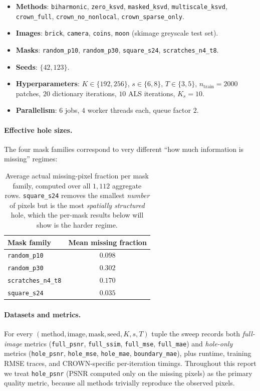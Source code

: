 \documentclass[11pt,a4paper]{article}
\newcommand{\method}[1]{\texttt{#1}}
\begin{document}
\begin{itemize}[leftmargin=1.2em,itemsep=2pt,topsep=2pt]
\item \textbf{Methods}: \method{biharmonic}, \method{zero\_ksvd},
\method{masked\_ksvd}, \method{multiscale\_ksvd},
\method{crown\_full}, \method{crown\_no\_nonlocal},
\method{crown\_sparse\_only}.
\item \textbf{Images}: \texttt{brick}, \texttt{camera},
\texttt{coins}, \texttt{moon} (skimage greyscale test set).
\item \textbf{Masks}: \texttt{random\_p10}, \texttt{random\_p30},
\texttt{square\_s24}, \texttt{scratches\_n4\_t8}.
\item \textbf{Seeds}: $\{42, 123\}$.
\item \textbf{Hyperparameters}: $K\in\{192,256\}$, $s\in\{6,8\}$,
$T\in\{3,5\}$, $n_{\text{train}}=2000$ patches, $20$ dictionary
iterations, $10$ ALS iterations, $K_s=10$.
\item \textbf{Parallelism}: $6$ jobs, $4$ worker threads each, queue
factor $2$.
\end{itemize}

\paragraph{Effective hole sizes.}
The four mask families correspond to very different
``how much information is missing'' regimes:

\begin{table}[h]
\centering\small
\begin{tabular}{lc}
\toprule
Mask family & Mean missing fraction \\
\midrule
\texttt{random\_p10}      & $0.098$ \\
\texttt{random\_p30}      & $0.302$ \\
\texttt{scratches\_n4\_t8}& $0.170$ \\
\texttt{square\_s24}      & $0.035$ \\
\bottomrule
\end{tabular}
\caption{Average actual missing-pixel fraction per mask family,
computed over all $1{,}112$ aggregate rows. \texttt{square\_s24}
removes the smallest \emph{number} of pixels but is the most
\emph{spatially structured} hole, which the per-mask results below
will show is the harder regime.}
\label{tab:masks}
\end{table}

\paragraph{Datasets and metrics.}
For every $(\text{method},\text{image},\text{mask},\text{seed},
K,s,T)$ tuple the sweep records both \emph{full-image} metrics
(\texttt{full\_psnr}, \texttt{full\_ssim}, \texttt{full\_mse},
\texttt{full\_mae}) and \emph{hole-only} metrics
(\texttt{hole\_psnr}, \texttt{hole\_mse}, \texttt{hole\_mae},
\texttt{boundary\_mae}), plus runtime, training RMSE traces, and
CROWN-specific per-iteration timings. Throughout this report we
treat \texttt{hole\_psnr} (PSNR computed only on the missing
pixels) as the primary quality metric, because all methods
trivially reproduce the observed pixels.
\end{document}
